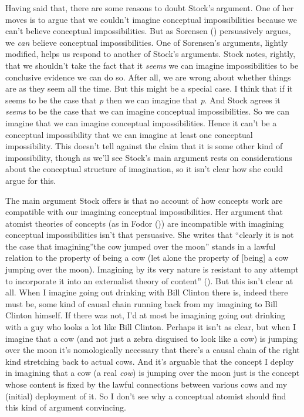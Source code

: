 \documentclass[
  10pt,
  letterpaper,
  DIV=11,
  numbers=noendperiod,
  twoside]{scrartcl}
\begin{document}
Having said that, there are some reasons to doubt Stock's argument. One
of her moves is to argue that we couldn't imagine conceptual
impossibilities because we can't believe conceptual impossibilities. But
as Sorensen () persuasively argues, we
\emph{can} believe conceptual impossibilities. One of Sorensen's
arguments, lightly modified, helps us respond to another of Stock's
arguments. Stock notes, rightly, that we shouldn't take the fact that it
\emph{seems} we can imagine impossibilities to be conclusive evidence we
can do so. After all, we are wrong about whether things are as they seem
all the time. But this might be a special case. I think that if it seems
to be the case that \emph{p} then we can imagine that \emph{p}. And
Stock agrees it \emph{seems} to be the case that we can imagine
conceptual impossibilities. So we can imagine that we can imagine
conceptual impossibilities. Hence it can't be a conceptual impossibility
that we can imagine at least one conceptual impossibility. This doesn't
tell against the claim that it is some other kind of impossibility,
though as we'll see Stock's main argument rests on considerations about
the conceptual structure of imagination, so it isn't clear how she could
argue for this.

The main argument Stock offers is that no account of how concepts work
are compatible with our imagining conceptual impossibilities. Her
argument that atomist theories of concepts (as in Fodor
()) are incompatible with imagining
conceptual impossibilities isn't that persuasive. She writes that
``clearly it is not the case that imagining''the cow jumped over the
moon'' stands in a lawful relation to the property of being a cow (let
alone the property of {[}being{]} a cow jumping over the moon).
Imagining by its very nature is resistant to any attempt to incorporate
it into an externalist theory of content''
(). But this isn't clear at all. When
I imagine going out drinking with Bill Clinton there is, indeed there
must be, some kind of causal chain running back from my imagining to
Bill Clinton himself. If there was not, I'd at most be imagining going
out drinking with a guy who looks a lot like Bill Clinton. Perhaps it
isn't as clear, but when I imagine that a cow (and not just a zebra
disguised to look like a cow) is jumping over the moon it's
nomologically necessary that there's a causal chain of the right kind
stretching back to actual cows. And it's arguable that the concept I
deploy in imagining that a cow (a real \emph{cow}) is jumping over the
moon just is the concept whose content is fixed by the lawful
connections between various cows and my (initial) deployment of it. So I
don't see why a conceptual atomist should find this kind of argument
convincing.
\end{document}
